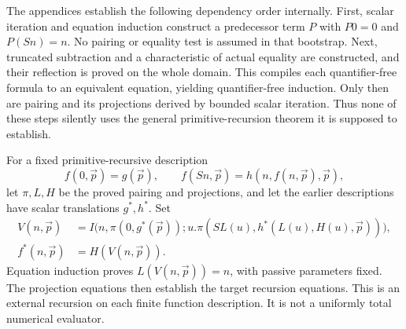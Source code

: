 \documentclass[11pt,letterpaper]{article}
\theoremstyle{definition}\newtheorem{definition}[theorem]{Definition}
\theoremstyle{remark}\newtheorem{remark}[theorem]{Remark}
\begin{document}
The appendices establish the following dependency order internally.
First, scalar iteration and equation induction construct a predecessor
term $P$ with $P0=0$ and $P(Sn)=n$. No pairing or equality test is assumed
in that bootstrap. Next, truncated subtraction and a characteristic of
actual equality are constructed, and their reflection is proved on the
whole domain. This compiles each quantifier-free formula to an equivalent
equation, yielding quantifier-free induction. Only then are pairing and
its projections derived by bounded scalar iteration. Thus none of these
steps silently uses the general primitive-recursion theorem it is
supposed to establish.

For a fixed primitive-recursive description
\[
 f(0,\vec p)=g(\vec p),\qquad
 f(Sn,\vec p)=h(n,f(n,\vec p),\vec p),
\]
let $\pi,L,H$ be the proved pairing and projections, and let the earlier
descriptions have scalar translations $g^*,h^*$. Set
\begin{align*}
 V(n,\vec p)&=I\bigl(n,\pi(0,g^*(\vec p));
  u.\pi(SL(u),h^*(L(u),H(u),\vec p))\bigr),\\
 f^*(n,\vec p)&=H(V(n,\vec p)).
\end{align*}
Equation induction proves $L(V(n,\vec p))=n$, with passive parameters
fixed. The projection equations then establish the target recursion
equations. This is an external recursion on each finite function
description. It is not a uniformly total numerical evaluator.
\end{document}
